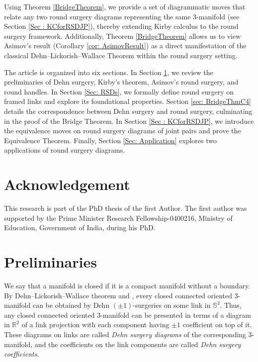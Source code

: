 \documentclass{amsart}
\theoremstyle{plain}
\theoremstyle{remark}
\theoremstyle{definition}
\newcommand{\R}{\mathbb{R}}
\newcommand{\s}{\mathbb{S}}
\begin{document}
Using Theorem \ref{BridgeTheorem}, we provide a set of diagrammatic moves that relate any two round surgery diagrams representing the same 3-manifold (see Section \ref{Sec : KCforRSDJP}), thereby extending Kirby calculus to the round surgery framework. Additionally, Theorem \ref{BridgeTheorem} allows us to view Asimov's result (Corollary \ref{cor: AsimovResult}) as a direct manifestation of the classical Dehn--Lickorish--Wallace Theorem within the round surgery setting.

The article is organized into six sections. In Section \ref{sec: Prelim}, we review the preliminaries of Dehn surgery, Kirby's theorem, Asimov's round surgery, and round handles. In Section \ref{Sec: RSDs}, we formally define round surgery on framed links and explore its foundational properties. Section \ref{sec: BridgeThmC4} details the correspondence between Dehn surgery and round surgery, culminating in the proof of the Bridge Theorem. In Section \ref{Sec : KCforRSDJP}, we introduce the equivalence moves on round surgery diagrams of joint pairs and prove the Equivalence Theorem. Finally, Section \ref{Sec: Application} explores two applications of round surgery diagrams.


\section*{Acknowledgement}
This research is part of the PhD thesis of the first Author.
The first author was supported by the Prime Minister Research Fellowship-0400216, Ministry of Education, Government of India, during his PhD. 


\section{Preliminaries}\label{sec: Prelim}
We say that a manifold is closed if it is a compact manifold without a boundary. 
By Dehn--Lickorish--Wallace theorem \cite{L} and \cite{W}, every closed connected oriented 3-manifold can be obtained by Dehn $(\pm1)$-surgeries on some link in $\s^3$. 
Thus, any closed connected oriented 3-manifold can be presented in terms of a diagram in $\R^2$ of a link projection with each component having $\pm1$ coefficient on top of it. 
These diagrams on links are called {\it Dehn surgery diagrams} of the corresponding 3-manifold, and the coefficients on the link components are called {\it Dehn surgery coefficients}. 
\end{document}
